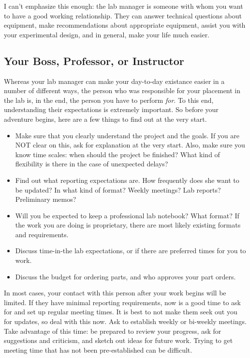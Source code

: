 \documentclass[11pt]{article}
\begin{document}
I can't emphasize this enough: the lab manager is someone with whom you want to have a good working relationship. They can answer technical questions about equipment, make recommendations about appropriate equipment, assist you with your experimental design, and in general, make your life much easier.

\subsection{Your Boss, Professor, or Instructor}

Whereas your lab manager can make your day-to-day existance easier in a number of different ways, the person who was responsible for your placement in the lab is, in the end, the person you have to perform \textit{for}. To this end, understanding their expectations is extremely important. So before your adventure begins, here are a few things to find out at the very start.

\begin{itemize}[noitemsep]
  \item Make sure that you clearly understand the project and the goals. If you are NOT clear on this, ask for explanation at the very start. Also, make sure you know time scales: when should the project be finished? What kind of flexibility is there in the case of unexpected delays?
  \item Find out what reporting expectations are. How frequently does she want to be updated? In what kind of format? Weekly meetings? Lab reports? Preliminary memos?
  \item Will you be expected to keep a professional lab notebook? What format? If the work you are doing is proprietary, there are most likely existing formats and requirements.
  \item Discuss time-in-the lab expectations, or if there are preferred times for you to work.
  \item Discuss the budget for ordering parts, and who approves your part orders.
\end{itemize}

In most cases, your contact with this person after your work begins will be limited. If they have minimal reporting requirements, now is a good time to ask for and set up regular meeting times. It is best to not make them seek out you for updates, so deal with this now. Ask to establish weekly or bi-weekly meetings. Take advantage of this time: be prepared to review your progress, ask for suggestions and criticism, and sketch out ideas for future work. Trying to get meeting time that has not been pre-established can be difficult.
\end{document}
